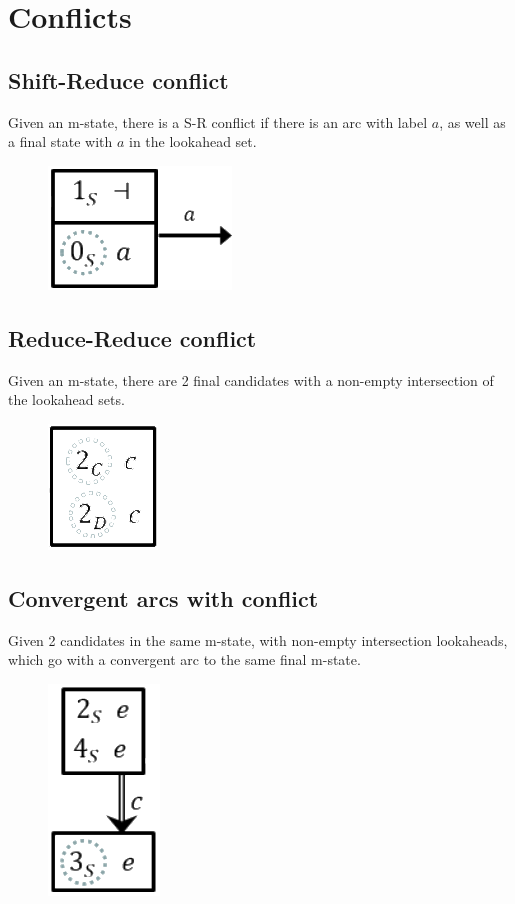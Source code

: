 \section{Conflicts}
\subsection{Shift-Reduce conflict}
Given an m-state, there is a S-R conflict if there is an arc with label $a$, as well as a final state with $a$ in the lookahead set.
\begin{figure}[H]
    \centering
    \includegraphics[width=0.2\linewidth]{parsing/shift-reduce-conflict.png}
\end{figure}

\subsection{Reduce-Reduce conflict}
Given an m-state, there are 2 final candidates with a non-empty intersection of the lookahead sets.
\begin{figure}[H]
    \centering
    \includegraphics[width=0.15\linewidth]{parsing/reduce-reduce-conflict.png}
\end{figure}

\subsection{Convergent arcs with conflict}
Given 2 candidates in the same m-state, with non-empty intersection lookaheads, which go with a convergent arc to the same final m-state.
\begin{figure}[H]
    \centering
    \includegraphics[width=0.15\linewidth]{parsing/convergent-conflict.png}
\end{figure}
